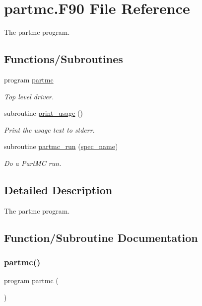 \hypertarget{partmc_8_f90}{}\section{partmc.\+F90 File Reference}
\label{partmc_8_f90}


The partmc program.  


\subsection*{Functions/\+Subroutines}
\begin{DoxyCompactItemize}
\item 
program \mbox{\hyperlink{partmc_8_f90_ab2045885c45ccf99e33fe9749fc952bd}{partmc}}
\begin{DoxyCompactList}\small\item\em Top level driver. \end{DoxyCompactList}\item 
subroutine \mbox{\hyperlink{partmc_8_f90_a96d0718eb3ffe924b0ed6bf52f51f366}{print\+\_\+usage}} ()
\begin{DoxyCompactList}\small\item\em Print the usage text to stderr. \end{DoxyCompactList}\item 
subroutine \mbox{\hyperlink{partmc_8_f90_a32ba5f48cd2e63a9f283a9906b45cf89}{partmc\+\_\+run}} (\mbox{\hyperlink{interfacepmc__aero__rep__data_1_1spec__name}{spec\+\_\+name}})
\begin{DoxyCompactList}\small\item\em Do a Part\+MC run. \end{DoxyCompactList}\end{DoxyCompactItemize}


\subsection{Detailed Description}
The partmc program. 



\subsection{Function/\+Subroutine Documentation}
\mbox{\label{partmc_8_f90_ab2045885c45ccf99e33fe9749fc952bd}} 
\subsubsection{\texorpdfstring{partmc()}{partmc()}}
{\footnotesize\ttfamily program partmc (\begin{DoxyParamCaption}{ }\end{DoxyParamCaption})}



